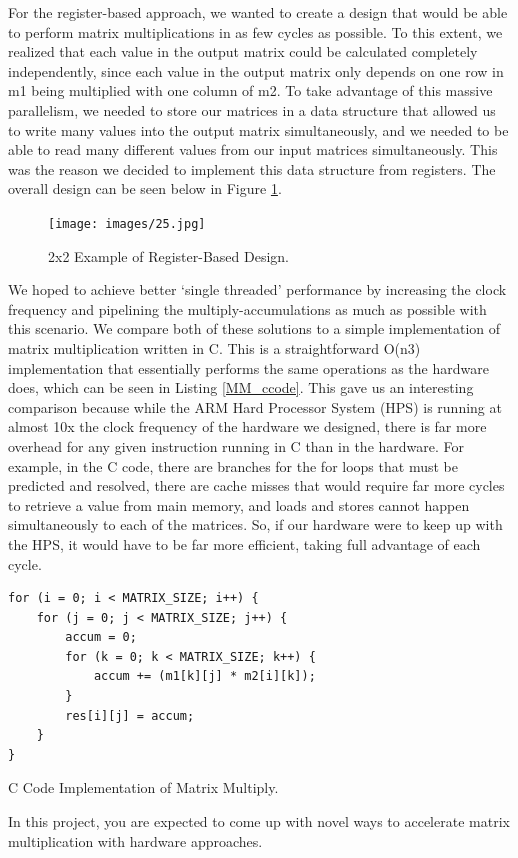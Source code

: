 \documentclass[a4paper,12pt,twoside]{article}
\begin{document}
For the register-based approach, we wanted to create a design that would be able to perform matrix multiplications in as few cycles as possible. To this extent, we realized that each value in the output matrix could be calculated completely independently, since each value in the output matrix only depends on one row in m1 being multiplied with one column of m2. To take advantage of this massive parallelism, we needed to store our matrices in a data structure that allowed us to write many values into the output matrix simultaneously, and we needed to be able to read many different values from our input matrices simultaneously. This was the reason we decided to implement this data structure from registers. The overall design can be seen below in Figure \ref{mac_2x2}.
\begin{figure}[H]
    \centering
    \texttt{[image: images/25.jpg]}
    \caption{2x2 Example of Register-Based Design.}
    \label{mac_2x2}
\end{figure}
We hoped to achieve better `single threaded' performance by increasing the clock frequency and pipelining the multiply-accumulations as much as possible with this scenario.
We compare both of these solutions to a simple implementation of matrix multiplication written in C. This is a straightforward O(n3) implementation that essentially performs the same operations as the hardware does, which can be seen in Listing \ref{MM_ccode}. This gave us an interesting comparison because while the ARM Hard Processor System (HPS) is running at almost 10x the clock frequency of the hardware we designed, there is far more overhead for any given instruction running in C than in the hardware. For example, in the C code, there are branches for the for loops that must be predicted and resolved, there are cache misses that would require far more cycles to retrieve a value from main memory, and loads and stores cannot happen simultaneously to each of the matrices. So, if our hardware were to keep up with the HPS, it would have to be far more efficient, taking full advantage of each cycle.
\begin{listing}[H]
\begin{verbatim}
for (i = 0; i < MATRIX_SIZE; i++) {
    for (j = 0; j < MATRIX_SIZE; j++) {
        accum = 0;
        for (k = 0; k < MATRIX_SIZE; k++) {
            accum += (m1[k][j] * m2[i][k]);
        }
        res[i][j] = accum;
    }
}
\end{verbatim}
\caption{C Code Implementation of Matrix Multiply.}
\label{MM_ccode}
\end{listing}
In this project, you are expected to come up with novel ways to accelerate matrix multiplication with hardware approaches.
\end{document}
